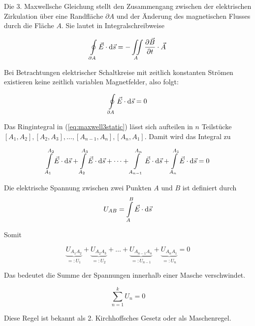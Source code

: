 \documentclass[a4paper,german,12pt,smallheadings]{scrartcl}
\begin{document}
Die 3. Maxwellsche Gleichung stellt den Zusammengang zwischen der elektrischen
Zirkulation über eine Randfläche $\partial A$ und der Änderung des magnetischen
Flusses durch die Fläche $A$. Sie lautet in Integralschreibweise

\begin{equation}
  \oint\limits_{\partial A} \vec{E} \cdot \dif \vec{s} = - \iint\limits_{A} \frac{\partial \vec{B}}{\partial t} \cdot \vec{A}
\end{equation}


Bei Betrachtungen elektrischer Schaltkreise mit zeitlich konstanten Strömen
existieren keine zeitlich variablen Magnetfelder, also folgt:

\begin{equation}
  \oint\limits_{\partial A} \vec{E} \cdot \dif \vec{s} = 0
  \label{eq:maxwell3static}
\end{equation}


Das Ringintegral in (\ref{eq:maxwell3static}) lässt sich aufteilen in $n$
Teilstücke $[A_1, A_2], [A_2, A_3], \dots, [A_{n-1}, A_n], [A_n, A_1]$. Damit
wird das Integral zu

\begin{equation}
  \int\limits_{A_1}^{A_2} \vec{E} \cdot \dif \vec{s} +
  \int\limits_{A_2}^{A_3} \vec{E} \cdot \dif \vec{s} +
  \dots +
  \int\limits_{A_{n-1}}^{A_n} \vec{E} \cdot \dif \vec{s} +
  \int\limits_{A_{n}}^{A_1} \vec{E} \cdot \dif \vec{s}
  = 0
\end{equation}

Die elektrische Spannung zwischen zwei Punkten $A$ und $B$ ist definiert durch
\begin{equation}
  U_{AB} = \int\limits_A^B \vec{E} \cdot \dif \vec{s}
\end{equation}

Somit

\begin{equation}
  \underbrace{U_{A_1A_2}}_{=: U_1} +
  \underbrace{U_{A_2A_3}}_{=: U_2} +
  \dots +
  \underbrace{U_{A_{n-1}A_n}}_{=: U_{n-1}} +
  \underbrace{U_{A_nA_1}}_{=: U_n} = 0
\end{equation}

Das bedeutet die Summe der Spannungen innerhalb einer Masche verschwindet.

\begin{equation}
  \sum_{n=1}^k U_n = 0
\end{equation}

Diese Regel ist bekannt als 2. Kirchhoffsches Gesetz oder als Maschenregel.
\end{document}
